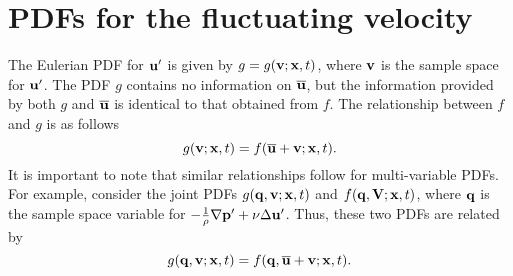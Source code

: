 \documentclass[oneside,a4paper,11pt]{report}
\begin{document}
\section{PDFs for the fluctuating velocity}

The Eulerian PDF  for $\mathbf{u}'$ is given by $g = g(\mathbf{v}; \mathbf{x},t)$, where $\mathbf{v}$ is the sample space for $\mathbf{u}'$. The PDF $g$ contains no information on $\overline{\mathbf{u}}$, but the information provided by both $g$ and $\overline{\mathbf{u}}$ is identical to that obtained from $f$. The relationship between $f$ and $g$ is as follows
\begin{equation}
\label{eul_g_f}
g(\mathbf{v}; \mathbf{x},t) = f(\overline{\mathbf{u}} + \mathbf{v}; \mathbf{x},t).
\end{equation}
It is important to note that similar relationships follow for multi-variable PDFs. For example, consider the joint PDFs $g(\mathbf{q},\mathbf{v}; \mathbf{x}, t)$ and $f(\mathbf{q}, \mathbf{V}; \mathbf{x}, t)$, where $\mathbf{q}$ is the sample space variable for $- \frac{1}{\rho} \nabla \mathbf{p}' +  \nu \Delta \mathbf{u}'$. Thus, these two PDFs are related by 
\begin{equation}
\label{eul_g_f_joint}
g(\mathbf{q}, \mathbf{v}; \mathbf{x},t) = f(\mathbf{q}, \overline{\mathbf{u}} + \mathbf{v}; \mathbf{x},t).
\end{equation}
\end{document}
